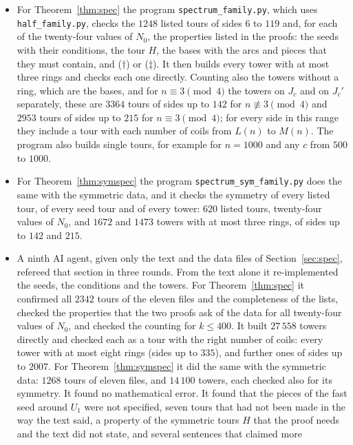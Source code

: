 \documentclass[11pt]{amsart}
\theoremstyle{remark}
\begin{document}
\begin{itemize}
$38$ listed tours were checked as well. The same was done for the tours and seeds of Theorem~\ref{thm:symmax},
with condition (Z$''$) and with the symmetry of every tour.
\item For Theorem~\ref{thm:spec} the program \texttt{spectrum\_family.py}, which uses \texttt{half\_family.py}, checks
the $1248$ listed tours of sides $6$ to $119$ and, for each of the twenty-four values of $N_0$, the properties listed
in the proofs: the seeds with their conditions, the tour $H$, the bases with the arcs and pieces that they must
contain, and ($\dagger$) or ($\ddagger$). It then builds every tower with at most three rings and checks each one
directly. Counting also the towers without a ring, which are the bases, and for $n\equiv3\pmod 4$ the towers on
$J_c$ and on $J_c'$ separately, these are $3364$ tours of sides up to $142$ for $n\not\equiv3\pmod 4$ and $2953$
tours of sides up to $215$ for $n\equiv3\pmod 4$; for every side in this range they include a tour with each number
of coils from $L(n)$ to $M(n)$. The program also builds single tours, for example for $n=1000$ and any $c$ from
$500$ to $1000$.
\item For Theorem~\ref{thm:symspec} the program \texttt{spectrum\_sym\_family.py} does the same with the symmetric
data, and it checks the symmetry of every listed tour, of every seed tour and of every tower: $620$ listed tours,
twenty-four values of $N_0$, and $1672$ and $1473$ towers with at most three rings, of sides up to $142$ and $215$.
\item A ninth AI agent, given only the text and the data files of Section~\ref{sec:spec}, refereed that section in
three rounds. From the text alone it re-implemented the seeds, the conditions and the towers. For
Theorem~\ref{thm:spec} it confirmed all $2342$ tours of the eleven files and the completeness of the lists, checked
the properties that the two proofs ask of the data for all twenty-four values of $N_0$, and checked the counting for
$k\le400$. It built $27\,558$ towers directly and checked each as a tour with the right number of coils: every tower
with at most eight rings (sides up to $335$), and further ones of sides up to $2007$. For
Theorem~\ref{thm:symspec} it did the same with the symmetric data: $1268$ tours of eleven files, and $14\,100$
towers, each checked also for its symmetry. It found no mathematical error. It found that the pieces of the fast
seed around $U_1$ were not specified, seven tours that had not been made in the way the text said, a property of
the symmetric tours $H$ that the proof needs and the text did not state, and several sentences that claimed more

\end{itemize}
\end{document}
